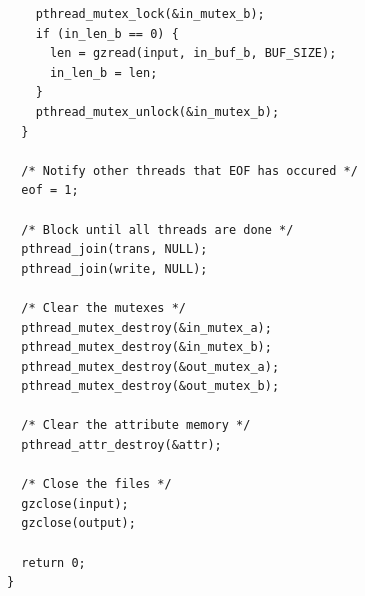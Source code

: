 \documentclass[a4paper,12pt]{article}
\begin{document}
\begin{verbatim}
    pthread_mutex_lock(&in_mutex_b);
    if (in_len_b == 0) {
      len = gzread(input, in_buf_b, BUF_SIZE);
      in_len_b = len;
    }
    pthread_mutex_unlock(&in_mutex_b);
  }

  /* Notify other threads that EOF has occured */
  eof = 1;

  /* Block until all threads are done */
  pthread_join(trans, NULL);
  pthread_join(write, NULL);

  /* Clear the mutexes */
  pthread_mutex_destroy(&in_mutex_a);
  pthread_mutex_destroy(&in_mutex_b);
  pthread_mutex_destroy(&out_mutex_a);
  pthread_mutex_destroy(&out_mutex_b);

  /* Clear the attribute memory */
  pthread_attr_destroy(&attr);

  /* Close the files */
  gzclose(input);
  gzclose(output);

  return 0;
}
\end{verbatim}
\end{document}
